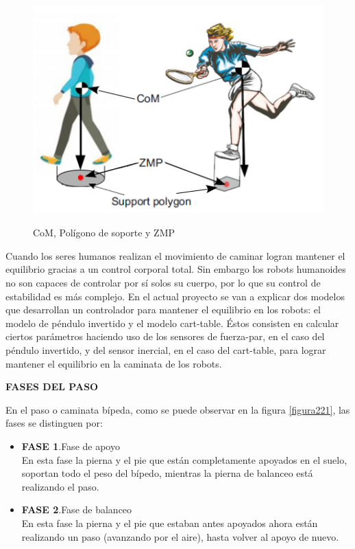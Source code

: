 \begin{figure}[H]
\centering
{\includegraphics[scale=0.6]{imagenes/apartado_2/220_com_zmp_supportpolygon}}
\caption{CoM, Polígono de soporte y ZMP}
\label{figura220}
\end{figure}

Cuando los seres humanos realizan el movimiento de caminar logran mantener el equilibrio gracias a un control corporal total. Sin embargo los robots humanoides no son capaces de controlar por sí solos su cuerpo, por lo que su control de estabilidad es más complejo. En el actual proyecto se van a explicar dos modelos que desarrollan un controlador para mantener el equilibrio en los robots: el modelo de péndulo invertido y el modelo cart-table. Éstos consisten en calcular ciertos parámetros haciendo uso de los sensores de fuerza-par, en el caso del péndulo invertido, y del sensor inercial, en el caso del cart-table, para lograr mantener el equilibrio en la caminata de los robots.

\textbf{FASES DEL PASO}

En el paso o caminata bípeda, como se puede observar en la figura \ref{figura221}, las fases se distinguen por:

\begin{itemize}
\item \textbf{FASE 1}.Fase de apoyo\\
En esta fase la pierna y el pie que están completamente apoyados en el suelo, soportan todo el peso del bípedo, mientras la pierna de balanceo está realizando el paso.

\item \textbf{FASE 2}.Fase de balanceo\\
En esta fase la pierna y el pie que estaban antes apoyados ahora están realizando un paso (avanzando por el aire), hasta volver al apoyo de nuevo. 

\end{itemize}

